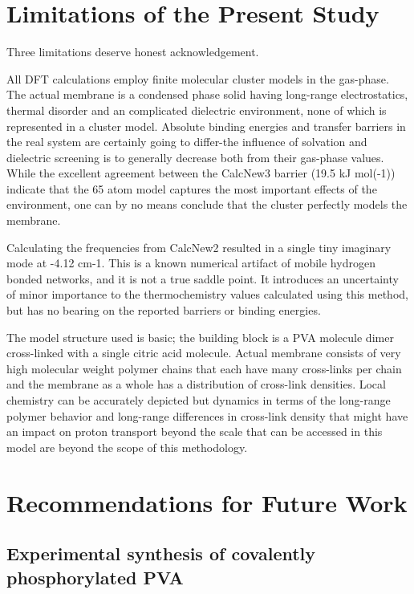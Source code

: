 \documentclass[12pt,a4paper]{report}
\begin{document}
\section{Limitations of the Present Study}

Three limitations deserve honest acknowledgement.

All DFT calculations employ finite molecular cluster models in the gas-phase. The actual membrane is a condensed phase solid having long-range electrostatics, thermal disorder and an complicated dielectric environment, none of which is represented in a cluster model. Absolute binding energies and transfer barriers in the real system are certainly going to differ-the influence of solvation and dielectric screening is to generally decrease both from their gas-phase values. While the excellent agreement between the CalcNew3 barrier (19.5 kJ mol(-1)) indicate that the 65 atom model captures the most important effects of the environment, one can by no means conclude that the cluster perfectly models the membrane.

Calculating the frequencies from CalcNew2 resulted in a single tiny imaginary mode at -4.12 cm-1. This is a known numerical artifact of mobile hydrogen bonded networks, and it is not a true saddle point. It introduces an uncertainty of minor importance to the thermochemistry values calculated using this method, but has no bearing on the reported barriers or binding energies.

The model structure used is basic; the building block is a PVA molecule dimer cross-linked with a single citric acid molecule. Actual membrane consists of very high molecular weight polymer chains that each have many cross-links per chain and the membrane as a whole has a distribution of cross-link densities. Local chemistry can be accurately depicted but dynamics in terms of the long-range polymer behavior and long-range differences in cross-link density that might have an impact on proton transport beyond the scale that can be accessed in this model are beyond the scope of this methodology.



\section{Recommendations for Future Work}

\subsection*{Experimental synthesis of covalently 
phosphorylated PVA}
\end{document}
